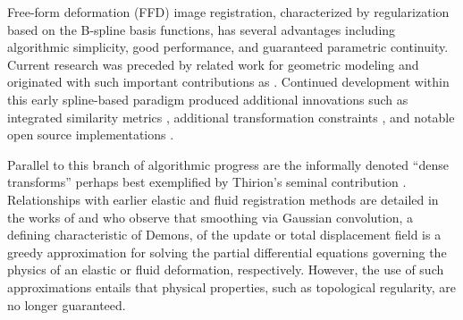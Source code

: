 \documentclass{frontiersSCNS}
\begin{document}
Free-form deformation (FFD) image registration, characterized by
regularization based on the B-spline basis functions, has several
advantages including algorithmic simplicity, good performance, and
guaranteed parametric continuity.  Current
research was preceded by related work for geometric modeling
\citep{sederberg1986} and originated with such important contributions
as \cite{szeliski1997,thevenaz1998,rueckert1999}.  Continued
development within this early spline-based paradigm produced
additional innovations such as integrated similarity metrics
\citep[e.g.][]{mattes2003}, additional transformation constraints
\citep[e.g.][]{rohlfing2003}, and notable open source implementations
\citep[e.g.][]{ibanez2005,klein2010,modat2010,shackleford2010}.

Parallel to this branch of algorithmic progress are the informally
denoted ``dense transforms'' perhaps best exemplified by Thirion's
seminal contribution \citep{thirion1998}.  Relationships with earlier
elastic \citep{bajcsy1989,gee1993} and fluid \citep{christensen1996}
registration methods are detailed in the works of
\cite{bro-nielsen1996} and \cite{pennec1999} who observe that
smoothing via Gaussian convolution, a defining characteristic of
Demons, of the update or total displacement field is a greedy
approximation for solving the partial differential equations governing
the physics of an elastic or fluid deformation, respectively.
However, the use of such approximations entails that physical
properties, such as topological regularity, are no longer guaranteed.
\end{document}
